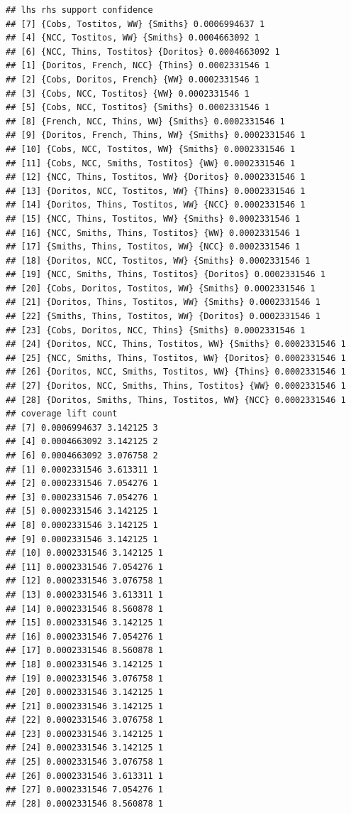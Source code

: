 \documentclass[
]{article}
\begin{document}
\begin{verbatim}
## lhs rhs support confidence
## [7] {Cobs, Tostitos, WW} {Smiths} 0.0006994637 1
## [4] {NCC, Tostitos, WW} {Smiths} 0.0004663092 1
## [6] {NCC, Thins, Tostitos} {Doritos} 0.0004663092 1
## [1] {Doritos, French, NCC} {Thins} 0.0002331546 1
## [2] {Cobs, Doritos, French} {WW} 0.0002331546 1
## [3] {Cobs, NCC, Tostitos} {WW} 0.0002331546 1
## [5] {Cobs, NCC, Tostitos} {Smiths} 0.0002331546 1
## [8] {French, NCC, Thins, WW} {Smiths} 0.0002331546 1
## [9] {Doritos, French, Thins, WW} {Smiths} 0.0002331546 1
## [10] {Cobs, NCC, Tostitos, WW} {Smiths} 0.0002331546 1
## [11] {Cobs, NCC, Smiths, Tostitos} {WW} 0.0002331546 1
## [12] {NCC, Thins, Tostitos, WW} {Doritos} 0.0002331546 1
## [13] {Doritos, NCC, Tostitos, WW} {Thins} 0.0002331546 1
## [14] {Doritos, Thins, Tostitos, WW} {NCC} 0.0002331546 1
## [15] {NCC, Thins, Tostitos, WW} {Smiths} 0.0002331546 1
## [16] {NCC, Smiths, Thins, Tostitos} {WW} 0.0002331546 1
## [17] {Smiths, Thins, Tostitos, WW} {NCC} 0.0002331546 1
## [18] {Doritos, NCC, Tostitos, WW} {Smiths} 0.0002331546 1
## [19] {NCC, Smiths, Thins, Tostitos} {Doritos} 0.0002331546 1
## [20] {Cobs, Doritos, Tostitos, WW} {Smiths} 0.0002331546 1
## [21] {Doritos, Thins, Tostitos, WW} {Smiths} 0.0002331546 1
## [22] {Smiths, Thins, Tostitos, WW} {Doritos} 0.0002331546 1
## [23] {Cobs, Doritos, NCC, Thins} {Smiths} 0.0002331546 1
## [24] {Doritos, NCC, Thins, Tostitos, WW} {Smiths} 0.0002331546 1
## [25] {NCC, Smiths, Thins, Tostitos, WW} {Doritos} 0.0002331546 1
## [26] {Doritos, NCC, Smiths, Tostitos, WW} {Thins} 0.0002331546 1
## [27] {Doritos, NCC, Smiths, Thins, Tostitos} {WW} 0.0002331546 1
## [28] {Doritos, Smiths, Thins, Tostitos, WW} {NCC} 0.0002331546 1
## coverage lift count
## [7] 0.0006994637 3.142125 3
## [4] 0.0004663092 3.142125 2
## [6] 0.0004663092 3.076758 2
## [1] 0.0002331546 3.613311 1
## [2] 0.0002331546 7.054276 1
## [3] 0.0002331546 7.054276 1
## [5] 0.0002331546 3.142125 1
## [8] 0.0002331546 3.142125 1
## [9] 0.0002331546 3.142125 1
## [10] 0.0002331546 3.142125 1
## [11] 0.0002331546 7.054276 1
## [12] 0.0002331546 3.076758 1
## [13] 0.0002331546 3.613311 1
## [14] 0.0002331546 8.560878 1
## [15] 0.0002331546 3.142125 1
## [16] 0.0002331546 7.054276 1
## [17] 0.0002331546 8.560878 1
## [18] 0.0002331546 3.142125 1
## [19] 0.0002331546 3.076758 1
## [20] 0.0002331546 3.142125 1
## [21] 0.0002331546 3.142125 1
## [22] 0.0002331546 3.076758 1
## [23] 0.0002331546 3.142125 1
## [24] 0.0002331546 3.142125 1
## [25] 0.0002331546 3.076758 1
## [26] 0.0002331546 3.613311 1
## [27] 0.0002331546 7.054276 1
## [28] 0.0002331546 8.560878 1
\end{verbatim}
\end{document}
